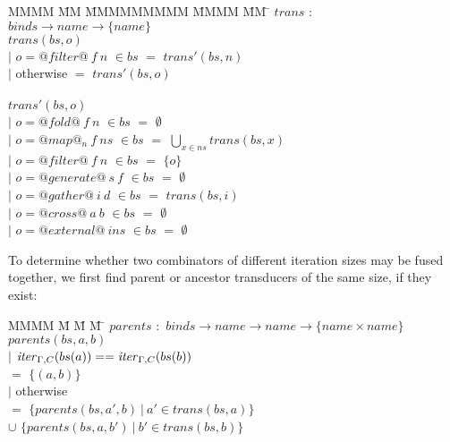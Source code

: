 \begin{tabbing}
MMMM \= MM \= MMMMMMMMM \= MMMM \= MM \= \kill
$trans$  \>$:$\> $binds \rightarrow name \rightarrow \{name\}$ \\
$trans(bs,o)$    \\
            \> $|$ \> $o = @filter@~f~n$    \> $\in bs$ \> $=$ \> $trans'(bs,n)$ \\
            \> $|$ \> otherwise             \>          \> $=$ \> $trans'(bs,o)$ \\
\\
$trans'(bs,o)$    \\
            \> $|$ \> $o = @fold@~f~n$      \> $\in bs$ \> $=$ \> $\emptyset$ \\
            \> $|$ \> $o = @map@_n~f~ns$    \> $\in bs$ \> $=$ \> $\bigcup_{x \in ns} trans(bs, x)$ \\
            \> $|$ \> $o = @filter@~f~n$    \> $\in bs$ \> $=$ \> $\{o\}$       \\
            \> $|$ \> $o = @generate@~s~f$  \> $\in bs$ \> $=$ \> $\emptyset$ \\
            \> $|$ \> $o = @gather@~i~d$    \> $\in bs$ \> $=$ \> $trans(bs,i)$ \\
            \> $|$ \> $o = @cross@~a~b$     \> $\in bs$ \> $=$ \> $\emptyset$ \\
            \> $|$ \> $o = @external@~ins$  \> $\in bs$ \> $=$ \> $\emptyset$ \\
\end{tabbing}

To determine whether two combinators of different iteration sizes may be fused together, we first find parent or ancestor transducers of the same size, if they exist:

\begin{tabbing}
MMMM \= M \= M \= M \= \kill
$parents$ \> $:$ \> $binds \to name \to name \to \{name \times name\}$ \\
$parents(bs, a, b)$ \\
        \> $|$ \> $\mathit{iter}_{\Gamma,C}(bs(a)) == \mathit{iter}_{\Gamma,C}(bs(b))$ \\
        \>     \>                      \> $=$ \> $\{(a, b)\}$ \\
        \> $|$ \> otherwise            \\
        \>     \>                      \> $=$    \> $\{ parents(bs, a', b) ~|~ a' \in trans(bs, a) \} $      \\
        \>     \>                      \> $\cup$ \> $\{ parents(bs, a, b') ~|~ b' \in trans(bs, b) \} $  \\
\end{tabbing}

